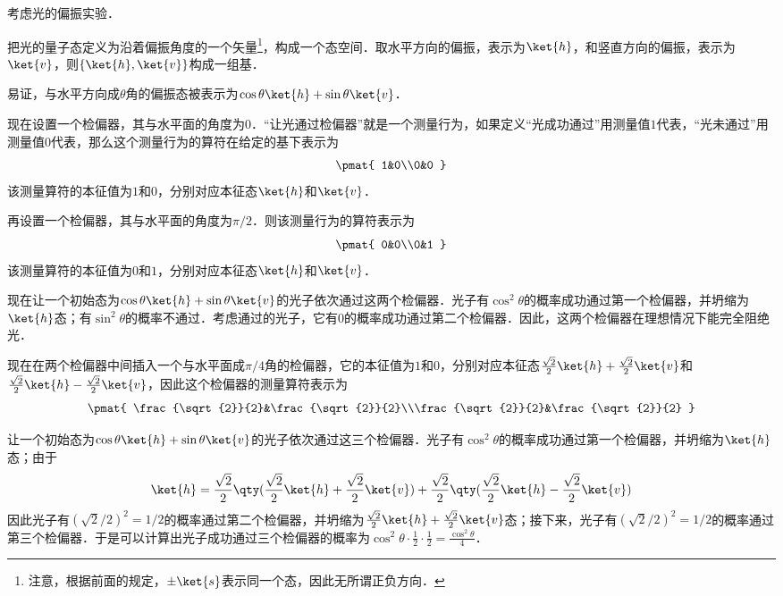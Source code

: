 \begin{example}{}
考虑光的偏振实验．

把光的量子态定义为沿着偏振角度的一个矢量\footnote{注意，根据前面的规定，$\pm\ket{s}$表示同一个态，因此无所谓正负方向．}，构成一个态空间．取水平方向的偏振，表示为$\ket{h}$，和竖直方向的偏振，表示为$\ket{v}$，则$\{\ket{h}, \ket{v}\}$构成一组基．

易证，与水平方向成$\theta$角的偏振态被表示为$\cos\theta\ket{h}+\sin\theta\ket{v}$．

现在设置一个检偏器，其与水平面的角度为$0$．“让光通过检偏器”就是一个测量行为，如果定义“光成功通过”用测量值$1$代表，“光未通过”用测量值$0$代表，那么这个测量行为的算符在给定的基下表示为
\begin{equation}
\pmat{
    1&0\\0&0
}
\end{equation}
该测量算符的本征值为$1$和$0$，分别对应本征态$\ket{h}$和$\ket{v}$．

再设置一个检偏器，其与水平面的角度为$\pi/2$．则该测量行为的算符表示为
\begin{equation}
\pmat{
    0&0\\0&1
}
\end{equation}
该测量算符的本征值为$0$和$1$，分别对应本征态$\ket{h}$和$\ket{v}$．

现在让一个初始态为$\cos\theta\ket{h}+\sin\theta\ket{v}$的光子依次通过这两个检偏器．光子有$\cos^2\theta$的概率成功通过第一个检偏器，并坍缩为$\ket{h}$态；有$\sin^2\theta$的概率不通过．考虑通过的光子，它有$0$的概率成功通过第二个检偏器．因此，这两个检偏器在理想情况下能完全阻绝光．

现在在两个检偏器中间插入一个与水平面成$\pi/4$角的检偏器，它的本征值为$1$和$0$，分别对应本征态$\frac{\sqrt{2}}{2}\ket{h}+\frac{\sqrt{2}}{2}\ket{v}$和$\frac{\sqrt{2}}{2}\ket{h}-\frac{\sqrt{2}}{2}\ket{v}$，因此这个检偏器的测量算符表示为
\begin{equation}
\pmat{
    \frac{\sqrt{2}}{2}&\frac{\sqrt{2}}{2}\\\frac{\sqrt{2}}{2}&\frac{\sqrt{2}}{2}
}
\end{equation}

让一个初始态为$\cos\theta\ket{h}+\sin\theta\ket{v}$的光子依次通过这三个检偏器．光子有$\cos^2\theta$的概率成功通过第一个检偏器，并坍缩为$\ket{h}$态；由于
\begin{equation}
\ket{h}=\frac{\sqrt{2}}{2}\qty(\frac{\sqrt{2}}{2}\ket{h}+\frac{\sqrt{2}}{2}\ket{v})+\frac{\sqrt{2}}{2}\qty(\frac{\sqrt{2}}{2}\ket{h}-\frac{\sqrt{2}}{2}\ket{v})
\end{equation}
因此光子有$(\sqrt{2}/2)^2=1/2$的概率通过第二个检偏器，并坍缩为$\frac{\sqrt{2}}{2}\ket{h}+\frac{\sqrt{2}}{2}\ket{v}$态；接下来，光子有$(\sqrt{2}/2)^2=1/2$的概率通过第三个检偏器．于是可以计算出光子成功通过三个检偏器的概率为$\cos^2\theta\cdot\frac{1}{2}\cdot\frac{1}{2}=\frac{\cos^2\theta}{4}$．

\end{example}


